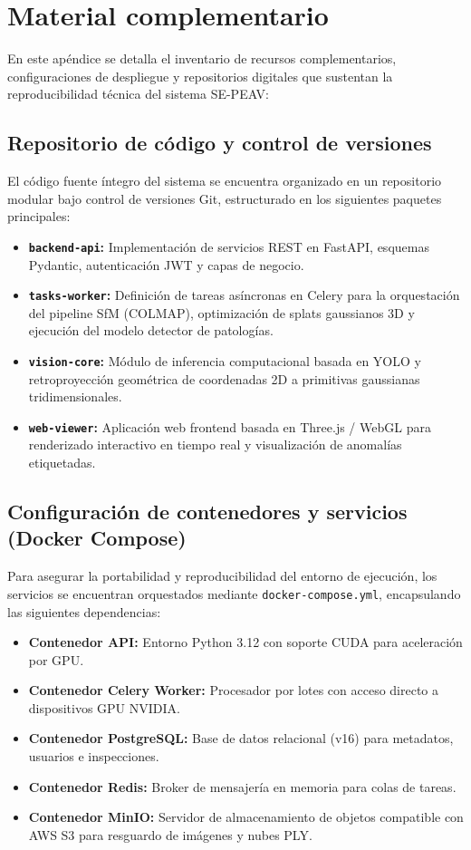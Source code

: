 \documentclass[12pt,oneside]{report}
\begin{document}
\chapter{Material complementario}

En este apéndice se detalla el inventario de recursos complementarios, configuraciones de despliegue y repositorios digitales que sustentan la reproducibilidad técnica del sistema SE-PEAV:

\section{Repositorio de código y control de versiones}
El código fuente íntegro del sistema se encuentra organizado en un repositorio modular bajo control de versiones Git, estructurado en los siguientes paquetes principales:
\begin{itemize}
  \item \textbf{\texttt{backend-api}:} Implementación de servicios REST en FastAPI, esquemas Pydantic, autenticación JWT y capas de negocio.
  \item \textbf{\texttt{tasks-worker}:} Definición de tareas asíncronas en Celery para la orquestación del pipeline SfM (COLMAP), optimización de splats gaussianos 3D y ejecución del modelo detector de patologías.
  \item \textbf{\texttt{vision-core}:} Módulo de inferencia computacional basada en YOLO y retroproyección geométrica de coordenadas 2D a primitivas gaussianas tridimensionales.
  \item \textbf{\texttt{web-viewer}:} Aplicación web frontend basada en Three.js / WebGL para renderizado interactivo en tiempo real y visualización de anomalías etiquetadas.
\end{itemize}

\section{Configuración de contenedores y servicios (Docker Compose)}
Para asegurar la portabilidad y reproducibilidad del entorno de ejecución, los servicios se encuentran orquestados mediante \texttt{docker-compose.yml}, encapsulando las siguientes dependencias:
\begin{itemize}
  \item \textbf{Contenedor API:} Entorno Python 3.12 con soporte CUDA para aceleración por GPU.
  \item \textbf{Contenedor Celery Worker:} Procesador por lotes con acceso directo a dispositivos GPU NVIDIA.
  \item \textbf{Contenedor PostgreSQL:} Base de datos relacional (v16) para metadatos, usuarios e inspecciones.
  \item \textbf{Contenedor Redis:} Broker de mensajería en memoria para colas de tareas.
  \item \textbf{Contenedor MinIO:} Servidor de almacenamiento de objetos compatible con AWS S3 para resguardo de imágenes y nubes PLY.
\end{itemize}
\end{document}
